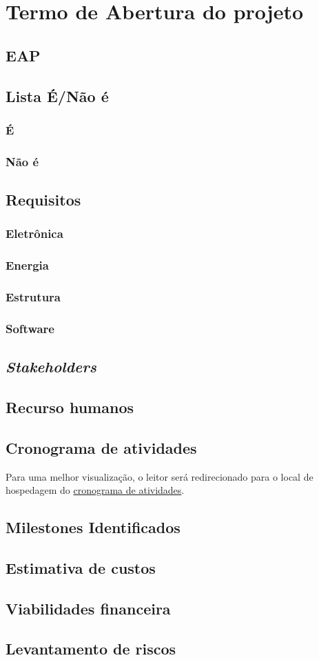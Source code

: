 \chapter{Termo de Abertura do projeto}

\section{EAP}
\section{Lista É/Não é}
\subsection{É}
\subsection{Não é}
\section{Requisitos}
\subsection{Eletrônica}
\subsection{Energia}
\subsection{Estrutura}
\subsection{Software}
\section{\emph{Stakeholders}}
\section{Recurso humanos}
\section{Cronograma de atividades}

Para uma melhor visualização, o leitor será redirecionado para o local de hospedagem do \href{https://docs.google.com/spreadsheets/d/1dcQycQPI0zbYMb-VP8nqHmpS_v0IhSz5-u9oQcoDKUI/edit?usp=sharing}{cronograma de atividades}.

\section{Milestones Identificados}
\section{Estimativa de custos}
\section{Viabilidades financeira}
\section{Levantamento de riscos}

